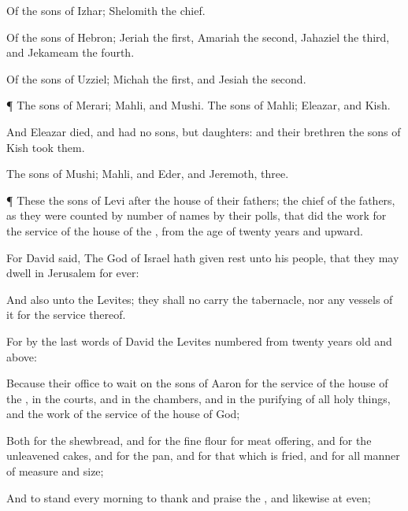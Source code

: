 {Of the
sons of
Izhar;
Shelomith the
chief.

Of the
sons of
Hebron;
Jeriah the
first,
Amariah the
second,
Jahaziel the
third, and
Jekameam the
fourth.

Of the
sons of
Uzziel;
Michah the
first, and
Jesiah the
second.


\par }{\PP {}¶ The
sons of
Merari;
Mahli, and
Mushi. The
sons of
Mahli;
Eleazar, and
Kish.

And
Eleazar
died, and had no
sons, but
daughters: and their
brethren the
sons of
Kish
took them.

The
sons of
Mushi;
Mahli, and
Eder, and
Jeremoth,
three.


\par }{\PP {}¶ These
{} the
sons of
Levi after the
house of their
fathers;
{} the
chief of the
fathers, as they were
counted by
number of
names by their
polls, that
did the
work for the
service of the
house of the
{}, from the
age of
twenty
years and
upward.

For
David
said, The
{}
God of
Israel hath given
rest unto his
people, that they may
dwell in
Jerusalem for
ever:

And also unto the
Levites; they shall no
{}
carry the
tabernacle, nor any
vessels of it for the
service thereof.

For by the
last
words of
David the
Levites
{}
numbered from
twenty
years
old and
above:

Because their
office
{} to
wait on the
sons of
Aaron for the
service of the
house of the
{}, in the
courts, and in the
chambers, and in the
purifying of all holy
things, and the
work of the
service of the
house of
God;

Both for the
shewbread, and for the fine
flour for meat
offering, and for the
unleavened
cakes, and for
{} the
pan, and for that which is
fried, and for all manner of
measure and
size;

And to
stand every
morning to
thank and
praise the
{}, and likewise at
even;

}
